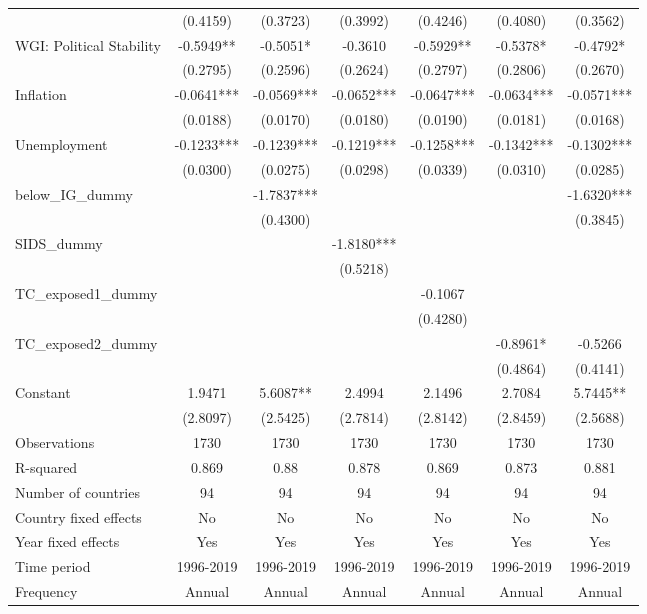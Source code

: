 \documentclass[10pt]{article}
\begin{document}
\begin{table}[h!]
\begin{threeparttable}
\begin{tabular}{lcccccc}
     & (0.4159) & (0.3723) & (0.3992) & (0.4246) & (0.4080) & (0.3562) \\[2pt]
    WGI: Political Stability & -0.5949** & -0.5051* & -0.3610 & -0.5929** & -0.5378* & -0.4792* \\
     & (0.2795) & (0.2596) & (0.2624) & (0.2797) & (0.2806) & (0.2670) \\[2pt]
    Inflation & -0.0641*** & -0.0569*** & -0.0652*** & -0.0647*** & -0.0634*** & -0.0571*** \\
     & (0.0188) & (0.0170) & (0.0180) & (0.0190) & (0.0181) & (0.0168) \\[2pt]
    Unemployment & -0.1233*** & -0.1239*** & -0.1219*** & -0.1258*** & -0.1342*** & -0.1302*** \\
     & (0.0300) & (0.0275) & (0.0298) & (0.0339) & (0.0310) & (0.0285) \\[2pt]
    below\_IG\_dummy &  & -1.7837*** &  &  &  & -1.6320*** \\
     &  & (0.4300) &  &  &  & (0.3845) \\[2pt]
    SIDS\_dummy &  &  & -1.8180*** &  &  &  \\
     &  &  & (0.5218) &  &  &  \\[2pt]
    TC\_exposed1\_dummy &  &  &  & -0.1067 &  &  \\
     &  &  &  & (0.4280) &  &  \\[2pt]
    TC\_exposed2\_dummy &  &  &  &  & -0.8961* & -0.5266 \\
     &  &  &  &  & (0.4864) & (0.4141) \\[2pt]
    \midrule
    Constant & 1.9471 & 5.6087** & 2.4994 & 2.1496 & 2.7084 & 5.7445** \\
     & (2.8097) & (2.5425) & (2.7814) & (2.8142) & (2.8459) & (2.5688) \\[2pt]
    Observations & 1730 & 1730 & 1730 & 1730 & 1730 & 1730 \\
    R-squared & 0.869 & 0.88 & 0.878 & 0.869 & 0.873 & 0.881 \\
    Number of countries & 94 & 94 & 94 & 94 & 94 & 94 \\
    Country fixed effects & No & No & No & No & No & No \\
    Year fixed effects & Yes & Yes & Yes & Yes & Yes & Yes \\
    Time period & 1996-2019 & 1996-2019 & 1996-2019 & 1996-2019 & 1996-2019 & 1996-2019 \\
    Frequency & Annual & Annual & Annual & Annual & Annual & Annual \\
    \bottomrule

\end{tabular}
\end{threeparttable}
\end{table}
\end{document}
